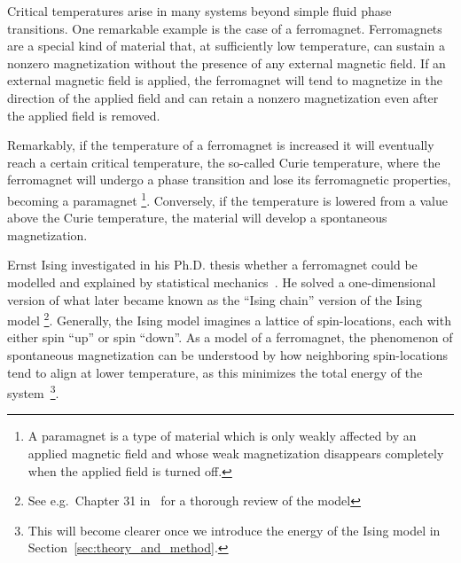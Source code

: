 \documentclass[english,notitlepage,reprint]{revtex4-2}  %
\begin{document}

Critical temperatures arise in many systems beyond simple fluid phase transitions. One remarkable example is the case of a ferromagnet.  
Ferromagnets are a special kind of material that, at sufficiently low temperature, can sustain a nonzero magnetization without the presence of any external magnetic field. 
If an external magnetic field is applied, the ferromagnet will tend to magnetize in the direction of the applied field and can retain a nonzero magnetization even after the applied field is removed.

Remarkably, if the temperature of a ferromagnet is increased it will eventually reach a certain critical temperature, the so-called Curie temperature, where the ferromagnet will undergo a phase transition and lose its ferromagnetic properties, becoming a paramagnet \footnote{A paramagnet is a type of material which is only weakly affected by an applied magnetic field and whose weak magnetization disappears completely when the applied field is turned off.}.
Conversely, if the temperature is lowered from a value above the Curie temperature, the material will develop a spontaneous magnetization.


Ernst Ising investigated in his Ph.D. thesis whether a ferromagnet could be modelled and explained by statistical mechanics~\cite{kulske_ising_2025}. 
He solved a one-dimensional version of what later became known as the ``Ising chain'' version of the Ising model \footnote{See e.g.~Chapter 31 in~\cite{IntroStatMekSwendsen} for a thorough review of the model}.
Generally, the Ising model imagines a lattice of spin-locations, each with either spin ``up'' or spin ``down''. 
As a model of a ferromagnet, the phenomenon of spontaneous magnetization can be understood by how neighboring spin-locations tend to align at lower temperature, as this minimizes the total energy of the system~\footnote{This will become clearer once we introduce the energy of the Ising model in Section~\ref{sec:theory_and_method}.}.
\end{document}
